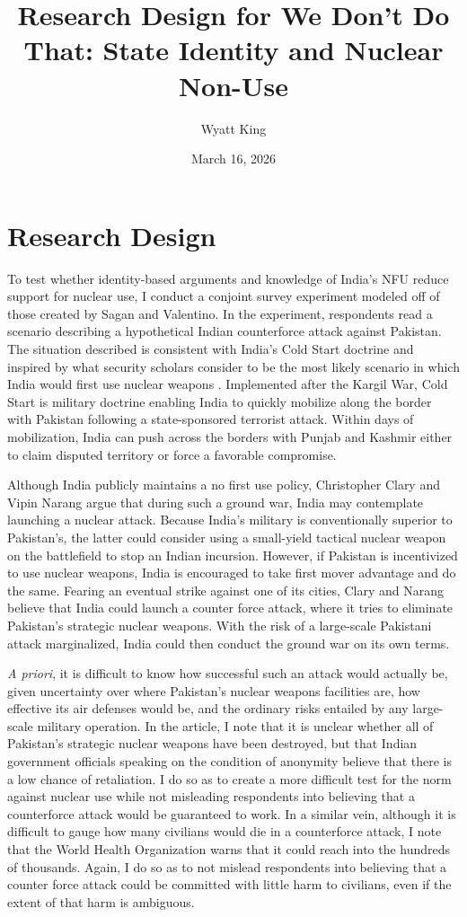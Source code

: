 \documentclass[12pt]{article}
\title{Research Design for We Don't Do That: State Identity and Nuclear Non-Use}
\author{Wyatt King}
\date{March 16, 2026}
\begin{document}
\maketitle
\section{Research Design}
To test whether identity-based arguments and knowledge of India's NFU reduce support for nuclear use, I conduct a conjoint survey experiment modeled off of those created by Sagan and Valentino. In the experiment, respondents read a scenario describing a hypothetical Indian counterforce attack against Pakistan. The situation described is consistent with India's Cold Start doctrine and inspired by what security scholars consider to be the most likely scenario in which India would first use nuclear weapons \citep{kapur_ten_2008, clary_indias_2019}. Implemented after the Kargil War, Cold Start is military doctrine enabling India to quickly mobilize along the border with Pakistan following a state-sponsored terrorist attack. Within days of mobilization, India can push across the borders with Punjab and Kashmir either to claim disputed territory or force a favorable compromise. 

Although India publicly maintains a no first use policy, Christopher Clary and Vipin Narang argue that during such a ground war, India may contemplate launching a nuclear attack. Because India's military is conventionally superior to Pakistan's, the latter could consider using a small-yield tactical nuclear weapon on the battlefield to stop an Indian incursion. However, if Pakistan is incentivized to use nuclear weapons, India is encouraged to take first mover advantage and do the same. Fearing an eventual strike against one of its cities, Clary and Narang believe that India could launch a counter force attack, where it tries to eliminate Pakistan's strategic nuclear weapons. With the risk of a large-scale Pakistani attack marginalized, India could then conduct the ground war on its own terms.

\textit{A priori}, it is difficult to know how successful such an attack would actually be, given uncertainty over where Pakistan's nuclear weapons facilities are, how effective its air defenses would be, and the ordinary risks entailed by any large-scale military operation. In the article, I note that it is unclear whether all of Pakistan's strategic nuclear weapons have been destroyed, but that Indian government officials speaking on the condition of anonymity believe that there is a low chance of retaliation. I do so as to create a more difficult test for the norm against nuclear use while not misleading respondents into believing that a counterforce attack would be guaranteed to work. In a similar vein, although it is difficult to gauge how many civilians would die in a counterforce attack, I note that the World Health Organization warns that it could reach into the hundreds of thousands. Again, I do so as to not mislead respondents into believing that a counter force attack could be committed with little harm to civilians, even if the extent of that harm is ambiguous.
\end{document}
